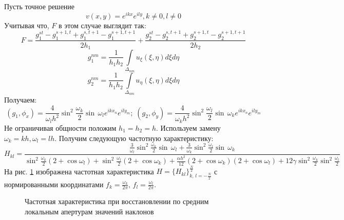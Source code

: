 \documentclass{article}
\begin{document}
Пусть точное решение $$v(x,y) = e^{ikx}e^{ily}, k \neq 0, l \neq 0$$
Учитывая что, $F$ в этом случае выглядит так:
$$F = \frac{g_1^{st} - g_1^{s+1,t} + g_1^{s,t+1} - g_1^{s+1,t+1}}{2h_1} + \frac{g_2^{st} - g_2^{s,t+1} + g_2^{s+1,t} - g_2^{s+1, t+1}}{2h_2}$$
$$g_1^{nm} = \frac{1}{h_1h_2}\int \limits _{\Delta_{nm}} u_\xi(\xi,\eta) d\xi d\eta$$
$$g_2^{nm} = \frac{1}{h_1h_2}\int \limits _{\Delta_{nm}} u_\eta(\xi,\eta) d\xi d\eta$$
Получаем:
$$(g_1, \phi_x) = \frac{4}{\omega_l h^2}  \sin^2\frac{\omega_k}{2}  \sin\,\omega_l e^{ikx_n}e^{ily_m}; \; (g_2, \phi_y) = \frac{4}{\omega_k h^2}  \sin^2\frac{\omega_l}{2}  \sin\,\omega_k e^{ikx_n} e^{ily_m}$$
Не ограничивая общности положим $h_1 = h_2 = h$. Используем замену $\omega_k = kh, \omega_l = lh$. Получим следующую частотную характеристику:
$$H_{kl} = \frac{\frac{3}{\omega_l}  \sin^2\frac{\omega_k}{2}  \sin\,\omega_l + \frac{3}{\omega_k}  \sin^2\frac{\omega_l}{2}  \sin\,\omega_k }
            { \sin^2\frac{\omega_k}{2}(2 +  \cos\omega_l) +  \sin^2\frac{\omega_l}{2}(2  +  \cos\omega_k) + \frac{\alpha h^2}{12}(2 +  \cos\omega_k)(2 +  \cos\omega_l) + 12\gamma  \sin^2\frac{\omega_k}{2}  \sin^2\frac{\omega_l}{2}}$$
На рис. \ref{ris:piece_plt} изображена частотная характеристика $H=\{H_{kl}\}^{\frac{N}{2}}_{k,\,l=-\frac{N}{2}}$ с нормированными координатами $f_k = \frac{\omega_k}{2\pi} ,\, f_l = \frac{\omega_l}{2\pi}$.
\begin{figure}[H]
\caption{Частотная характеристика при восстановлении по средним локальным апертурам значений наклонов}
\label{ris:piece_plt}
\end{figure}
\end{document}
